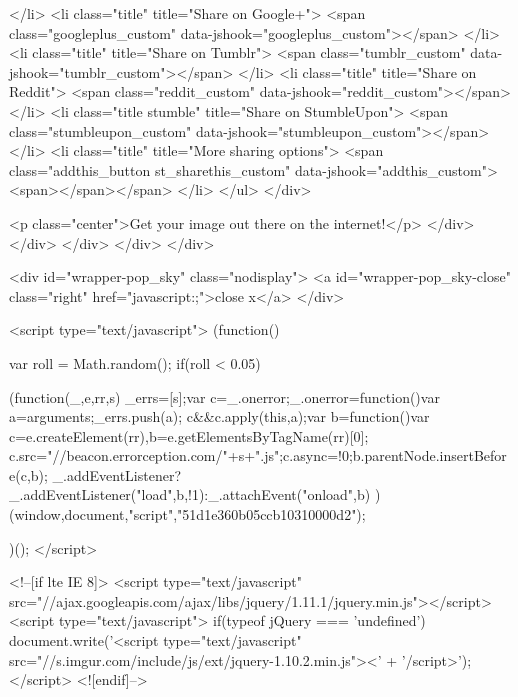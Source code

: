         </li>
        <li class="title" title="Share on Google+">
            <span class="googleplus_custom" data-jshook="googleplus_custom"></span>
        </li>
        <li class="title" title="Share on Tumblr">
            <span class="tumblr_custom" data-jshook="tumblr_custom"></span>
        </li>
        <li class="title" title="Share on Reddit">
            <span class="reddit_custom" data-jshook="reddit_custom"></span>
        </li>
        <li class="title stumble" title="Share on StumbleUpon">
            <span class="stumbleupon_custom" data-jshook="stumbleupon_custom"></span>
        </li>
        <li class="title" title="More sharing options">
            <span class="addthis_button st_sharethis_custom" data-jshook="addthis_custom"><span></span></span>
        </li>
    </ul>
</div>

                    <p class="center">Get your image out there on the internet!</p>
                </div>
            </div>
        </div>
    </div>
</div>
    


            <div id="wrapper-pop_sky" class="nodisplay">
            <a id="wrapper-pop_sky-close" class="right" href="javascript:;">close x</a>
        </div>
    

        

    

            
    

    

            <script type="text/javascript">
            (function() {
                var roll = Math.random();
                if(roll < 0.05) {
                    
                    (function(_,e,rr,s){
                        _errs=[s];var c=_.onerror;_.onerror=function(){var a=arguments;_errs.push(a);
                        c&&c.apply(this,a)};var b=function(){var c=e.createElement(rr),b=e.getElementsByTagName(rr)[0];
                        c.src="//beacon.errorception.com/"+s+".js";c.async=!0;b.parentNode.insertBefore(c,b)};
                        _.addEventListener?_.addEventListener("load",b,!1):_.attachEvent("onload",b)
                    })(window,document,"script","51d1e360b05ccb10310000d2");
                    
                }
            })();
        </script>

        
<!--[if lte IE 8]>
<script type="text/javascript" src="//ajax.googleapis.com/ajax/libs/jquery/1.11.1/jquery.min.js"></script>
<script type="text/javascript">
if(typeof jQuery === 'undefined') {
    document.write('<script type="text/javascript" src="//s.imgur.com/include/js/ext/jquery-1.10.2.min.js"><' + '/script>');
}
</script>
<![endif]-->

